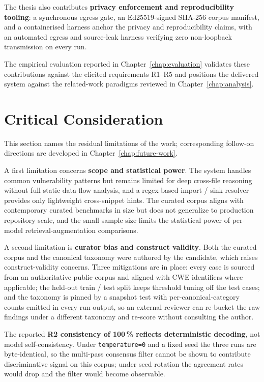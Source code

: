 The thesis also contributes \textbf{privacy enforcement and reproducibility tooling}: a synchronous egress gate, an Ed25519-signed SHA-256 corpus manifest, and a containerised harness anchor the privacy and reproducibility claims, with an automated egress and source-leak harness verifying zero non-loopback transmission on every run.

The empirical evaluation reported in Chapter~\ref{chap:evaluation} validates these contributions against the elicited requirements R1--R5 and positions the delivered system against the related-work paradigms reviewed in Chapter~\ref{chap:analysis}.


\section{Critical Consideration}
\label{sec:conclusion-limitations}

This section names the residual limitations of the work; corresponding follow-on directions are developed in Chapter~\ref{chap:future-work}.

A first limitation concerns \textbf{scope and statistical power}. The system handles common vulnerability patterns but remains limited for deep cross-file reasoning without full static data-flow analysis, and a regex-based import / sink resolver provides only lightweight cross-snippet hints. The curated corpus aligns with contemporary curated benchmarks in size but does not generalize to production repository scale, and the small sample size limits the statistical power of per-model retrieval-augmentation comparisons.

A second limitation is \textbf{curator bias and construct validity}. Both the curated corpus and the canonical taxonomy were authored by the candidate, which raises construct-validity concerns. Three mitigations are in place: every case is sourced from an authoritative public corpus and aligned with CWE identifiers where applicable; the held-out train / test split keeps threshold tuning off the test cases; and the taxonomy is pinned by a snapshot test with per-canonical-category counts emitted in every run output, so an external reviewer can re-bucket the raw findings under a different taxonomy and re-score without consulting the author.

The reported \textbf{R2 consistency of 100\,\% reflects deterministic decoding}, not model self-consistency. Under \texttt{temperature=0} and a fixed seed the three runs are byte-identical, so the multi-pass consensus filter cannot be shown to contribute discriminative signal on this corpus; under seed rotation the agreement rates would drop and the filter would become observable.

